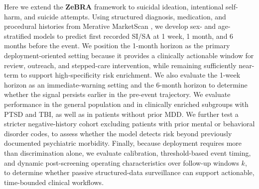 \documentclass[onecolumn, compsoc,11pt]{IEEEtran}
\def\zebra{\textbf{ZeBRA}\xspace}
\def\zebra{\textbf{ZeBRA}\xspace}
\begin{document}
Here we extend the \zebra framework to suicidal ideation, intentional self-harm, and suicide attempts. Using structured diagnosis, medication, and procedural histories from Merative MarketScan \cite{hansen2017truven}, we develop sex- and age-stratified models to predict first recorded SI/SA at 1 week, 1 month, and 6 months before the event. We position the 1-month horizon as the primary deployment-oriented setting because it provides a clinically actionable window for review, outreach, and stepped-care intervention, while remaining sufficiently near-term to support high-specificity risk enrichment. We also evaluate the 1-week horizon as an immediate-warning setting and the 6-month horizon to determine whether the signal persists earlier in the pre-event trajectory. We evaluate performance in the general population and in clinically enriched subgroups with PTSD and TBI, as well as in patients without prior MDD. We further test a stricter negative-history cohort excluding patients with prior mental or behavioral disorder codes, to assess whether the model detects risk beyond previously documented psychiatric morbidity. Finally, because deployment requires more than discrimination alone, we evaluate calibration, threshold-based event timing, and dynamic post-screening operating characteristics over follow-up windows \(k\), to determine whether passive structured-data surveillance can support actionable, time-bounded clinical workflows.
\end{document}
